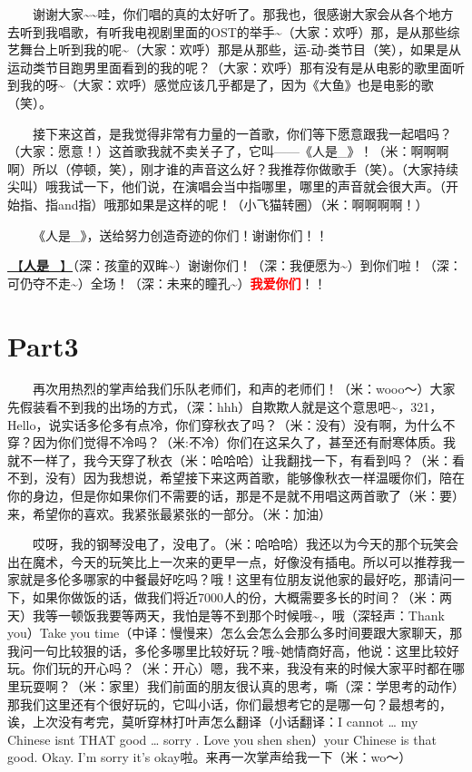 \documentclass[]{ctexbook}
\begin{document}
  谢谢大家\textasciitilde\textasciitilde 哇，你们唱的真的太好听了。那我也，很感谢大家会从各个地方去听到我唱歌，有听我电视剧里面的OST的举手\textasciitilde（大家：欢呼）那，是从那些综艺舞台上听到我的呢\textasciitilde（大家：欢呼）那是从那些，运-动-类节目（笑），如果是从运动类节目跑男里面看到的我的呢？（大家：欢呼）那有没有是从电影的歌里面听到我的呀\textasciitilde（大家：欢呼）感觉应该几乎都是了，因为《大鱼》也是电影的歌（笑）。

  接下来这首，是我觉得非常有力量的一首歌，你们等下愿意跟我一起唱吗？（大家：愿意！）这首歌我就不卖关子了，它叫------《人是\_》！（米：啊啊啊啊）所以（停顿，笑），刚才谁的声音这么好？我推荐你做歌手（笑）。（大家持续尖叫）哦我试一下，他们说，在演唱会当中指哪里，哪里的声音就会很大声。（开始指、指and指）哦那如果是这样的呢！（小飞猫转圈）（米：啊啊啊啊！）

  《人是\_》，送给努力创造奇迹的你们！谢谢你们！！

\hyperref[renshi]{🎵【\textbf{人是\_}】}（深：孩童的双眸\textasciitilde）谢谢你们！（深：我便愿为\textasciitilde）到你们啦！（深：可仍夺不走\textasciitilde）全场！（深：未来的瞳孔\textasciitilde）\textbf{\textcolor{red}{我爱你们}}！！

\section{Part3}\label{Toronto-20250314-part3}

  再次用热烈的掌声给我们乐队老师们，和声的老师们！（米：wooo～）大家先假装看不到我的出场的方式，（深：hhh）自欺欺人就是这个意思吧\textasciitilde，321，Hello，说实话多伦多有点冷，你们穿秋衣了吗？（米：没有）没有啊，为什么不穿？因为你们觉得不冷吗？（米:不冷）你们在这呆久了，甚至还有耐寒体质。我就不一样了，我今天穿了秋衣（米：哈哈哈）让我翻找一下，有看到吗？（米：看不到，没有）因为我想说，希望接下来这两首歌，能够像秋衣一样温暖你们，陪在你的身边，但是你如果你们不需要的话，那是不是就不用唱这两首歌了（米：要）来，希望你的喜欢。我紧张最紧张的一部分。（米：加油）

  哎呀，我的钢琴没电了，没电了。（米：哈哈哈）我还以为今天的那个玩笑会出在魔术，今天的玩笑比上一次来的更早一点，好像没有插电。所以可以推荐我一家就是多伦多哪家的中餐最好吃吗？哦！这里有位朋友说他家的最好吃，那请问一下，如果你做饭的话，做我们将近7000人的份，大概需要多长的时间？（米：两天）我等一顿饭我要等两天，我怕是等不到那个时候哦\textasciitilde，哦（深轻声：Thank you）Take you time（中译：慢慢来）怎么会怎么会那么多时间要跟大家聊天，那我问一句比较狠的话，多伦多哪里比较好玩？哦\textasciitilde 她情商好高，他说：这里比较好玩。你们玩的开心吗？（米：开心）嗯，我不来，我没有来的时候大家平时都在哪里玩耍啊？（米：家里）我们前面的朋友很认真的思考，嘶（深：学思考的动作）那我们这里还有个很好玩的，它叫小话，你们最想考它的是哪一句？最想考的，诶，上次没有考完，莫听穿林打叶声怎么翻译（小话翻译：I cannot \ldots{} my Chinese isnt THAT good \ldots{} sorry . Love you shen shen）your Chinese is that good. Okay. I'm sorry it's okay啦。来再一次掌声给我一下（米：wo～）
\end{document}
